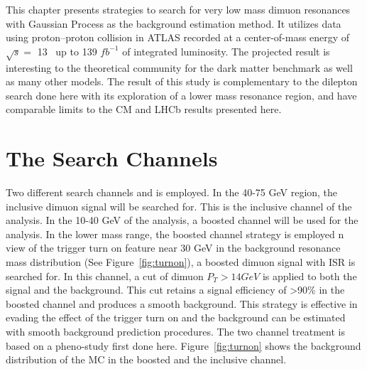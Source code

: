 This chapter presents strategies to search for very low mass dimuon resonances with Gaussian Process as the background estimation method. It utilizes data using proton--proton collision in ATLAS recorded at a center-of-mass energy of $\sqrt{s}=$ 13 ~\TeV up to 139 $fb^{-1}$ of integrated luminosity. The projected result is interesting to the theoretical community for the dark matter benchmark as well as many other models. The result of this study is complementary to the
dilepton search done here with its exploration of a lower mass resonance region, and have comparable limits to the CM and LHCb results presented here.


%
%    


\section{The Search Channels}
Two different search channels and is employed. In the 40-75 GeV region, the inclusive dimuon signal will be searched for. This is the inclusive channel of the analysis. In the 10-40 GeV of the analysis, a boosted channel will be used for the analysis. 
In the lower mass range, the boosted channel strategy is employed n view of the trigger turn on feature near 30 GeV in the background resonance mass distribution (See Figure~\ref{fig:turnon}), a boosted dimuon signal with ISR is searched for. In this channel, a cut of dimuon $P_{T}>14 GeV$ is applied to both the signal and the background. This cut retains a signal efficiency of >90\% in the boosted channel and produces a smooth background. This strategy is effective in evading the effect of the trigger turn on and the background can be estimated with smooth background prediction procedures. 
The two channel treatment is based on a pheno-study first done here\cite{2014}. Figure~\ref{fig:turnon} shows the background distribution of the MC in the boosted and the inclusive channel.

